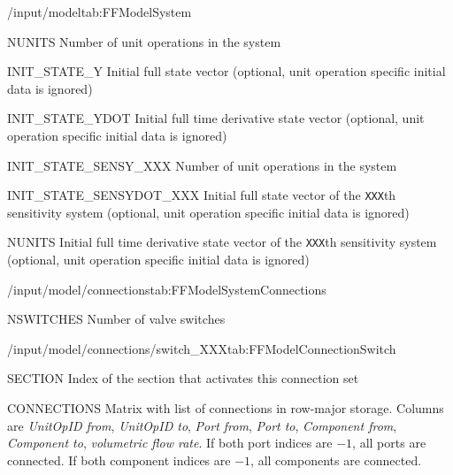 \begin{groupscope}{/input/model}{tab:FFModelSystem}
  \begin{dataset}[type=int,range={$\geq 1$},length=1]{NUNITS}
    Number of unit operations in the system
  \end{dataset}
  \begin{dataset}[type=int,range={$\geq 1$},length=1]{INIT\_STATE\_Y}
    Initial full state vector (optional, unit operation specific initial data is ignored)
  \end{dataset}
  \begin{dataset}[type=double,length={\texttt{NDOF}}]{INIT\_STATE\_YDOT}
    Initial full time derivative state vector (optional, unit operation specific initial data is ignored)
  \end{dataset}
  \begin{dataset}[type=double,length={\texttt{NDOF}}]{INIT\_STATE\_SENSY\_XXX}
    Number of unit operations in the system
  \end{dataset}
  \begin{dataset}[type=double,length={\texttt{NDOF}}]{INIT\_STATE\_SENSYDOT\_XXX}
    Initial full state vector of the \texttt{XXX}th sensitivity system (optional, unit operation specific initial data is ignored)
  \end{dataset}
  \begin{dataset}[type=double,length={\texttt{NDOF}}]{NUNITS}
    Initial full time derivative state vector of the \texttt{XXX}th sensitivity system (optional, unit operation specific initial data is ignored)
  \end{dataset}
\end{groupscope}

\begin{groupscope}{/input/model/connections}{tab:FFModelSystemConnections}
  \begin{dataset}[type=int,range={$\geq 1$},length=1]{NSWITCHES}
    Number of valve switches
  \end{dataset}
\end{groupscope}

\begin{groupscope}{/input/model/connections/switch\_XXX}{tab:FFModelConnectionSwitch}
  \begin{dataset}[type=int,range={$\geq 0$},length=1]{SECTION}
    Index of the section that activates this connection set
  \end{dataset}
  \begin{dataset}[type=double,range={$\geq -1$},length={$7 \cdot \texttt{NCONNECTIONS}$}]{CONNECTIONS}
    Matrix with list of connections in row-major storage.
    Columns are \emph{UnitOpID from}, \emph{UnitOpID to}, \emph{Port from}, \emph{Port to}, \emph{Component from}, \emph{Component to}, \emph{volumetric flow rate}.
    If both port indices are $-1$, all ports are connected.
    If both component indices are $-1$, all components are connected.
  \end{dataset}
\end{groupscope}

